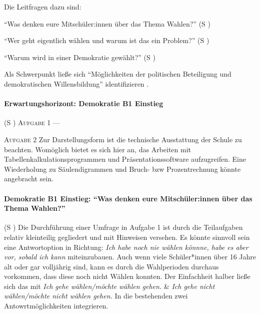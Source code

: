 Die Leitfragen dazu sind: 
\begin{myenumerate}
    \item \enquote{Was denken eure Mitschüler:innen über das Thema Wahlen?} (\gls{S} \pageref{DEMOKRATIE-B1})
    \item \enquote{Wer geht eigentlich wählen und warum ist das ein Problem?} (\gls{S} \pageref{DEMOKRATIE-B2})
    \item \enquote{Warum wird in einer Demokratie gewählt?} (\gls{S} \pageref{DEMOKRATIE-B3})
\end{myenumerate}
Als Schwerpunkt ließe sich
\enquote{Möglichkeiten der politischen Beteiligung und demokratischen Willensbildung} identifizieren \autocite[][16]{bplan}.


\paragraph{Erwartungshorizont: Demokratie B1 Einstieg} (\gls{S} \pageref{DEMOKRATIE-B1})
\textsc{Aufgabe 1} \quad ---

\textsc{Aufgabe 2} \quad Zur Darstellungsform ist die technische Ausstattung der Schule zu beachten. Womöglich bietet es sich hier an, das Arbeiten mit Tabellenkalkulationsprogrammen und Präsentationssoftware aufzugreifen.  Eine Wiederholung zu Säulendigrammen und Bruch- \gls{bzw} Prozentrechnung könnte angebracht sein. 
\\



\paragraph{Demokratie B1 Einstieg: \enquote{Was denken eure Mitschüler:innen über das Thema Wahlen?}}  (\gls{S} \pageref{DEMOKRATIE-B1})
Die Durchführung einer Umfrage in Aufgabe 1 ist durch die Teilaufgaben relativ kleinteilig gegliedert und mit Hinweisen versehen. Es könnte sinnvoll sein eine Antwortoption in Richtung: \emph{Ich habe noch nie wählen könnne, habe es aber vor, sobald ich kann} miteinzubauen. Auch wenn viele Schüler*innen über 16 Jahre alt oder gar volljährig sind, kann es durch die Wahlperioden durchaus vorkommen, dass diese noch nicht Wählen konnten. 
Der Einfachheit halber ließe sich das mit \emph{Ich gehe wählen/möchte wählen gehen.} \& \emph{Ich gehe nicht wählen/möchte nicht wählen gehen.} In die bestehenden zwei Antowrtmöglichkeiten integrieren. 

